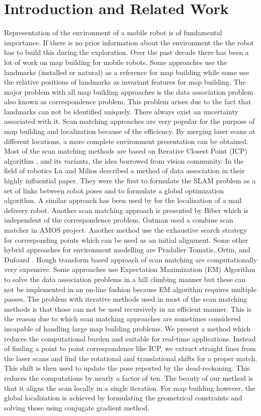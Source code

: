 \documentclass{article}
\begin{document}
\section{Introduction and Related Work}
Representation of the environment of a mobile robot is of
fundamental importance. If there is no prior information about the
environment the the robot has to build this during the exploration.
Over the past decade there has been a lot of work on map building
for mobile robots. Some approaches use the landmarks (installed or
natural) as a reference for map building while some use the relative
positions of landmarks as invariant features for map building.  The
major problem with all map building approaches is the data
association problem also known as correspondence problem. This
problem arises due to the fact that landmarks can not be identified
uniquely. There always exist an uncertainty associated with it. Scan
matching approaches are very popular for the purpose of map building
and localization because of the efficiency. By merging laser scans
at different locations, a more complete environment presentation can
be obtained. Most of the scan matching methods are based on
Iterative Closest Point  (ICP) algorithm \cite{Shewchuck},
and its variants, the idea borrowed from vision community.
  In the  field of robotics Lu and Milios described
 a method of data association in their highly influential paper. They were
the first to formulate the SLAM problem as a set of links between
robot poses and to formulate a global optimization algorithm. A
similar approach has been used by
 for the localization of a  mail delivery robot. Another
scan matching approach is presented by Biber\cite{minguez-metricbased} which is
independent of the correspondence problem. Gutman
used a combine scan matcher in AMOS project. Another
 method  use the exhaustive search strategy for corresponding points
 which can be used  as an initial alignment. Some other hybrid
approaches for environment modelling are Pradalier
Tomatis, Ortin, and Dufourd
. Hough transform based approach of scan matching
 are computationally very expensive. Some approaches
 use Expectation Maximization (EM) Algorithm
 to solve the data association problems in a hill
climbing manner but these can not be implemented in an on-line
fashion because EM algorithm requires multiple passes. The problem
with iterative methods used in most of the scan matching methods is
that those can not be used recursively in an efficient manner. This
is the reason due to which scan matching approaches are sometimes
considered incapable of handling large map building problems. We
present a method which reduces the computational burden and suitable
for real-time applications. Instead of finding a point to point
correspondence like ICP, we extract straight lines from the laser
scans and find the rotational and translational shifts for a proper
match. This shift is then used to update the pose reported by the
dead-reckoning. This reduces the computations by nearly a factor of
ten. The beauty of our method is that it aligns the scan locally in
a single iteration. For map building however, the global
localization is achieved by formulating the geometrical constraints
and solving those using conjugate gradient method.



\end{document}
